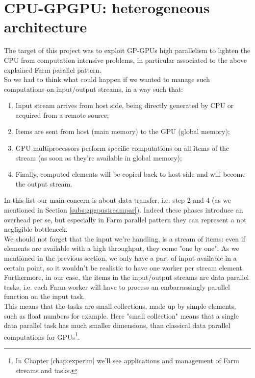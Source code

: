 	


\section{CPU-GPGPU: heterogeneous architecture}
	The target of this project was to exploit GP-GPUs high parallelism to lighten the CPU from computation intensive problems, in particular associated to the above explained Farm parallel pattern.\\
	So we had to think what could happen if we wanted to manage such computations on input/output streams, in a way such that:
	\begin{enumerate}
		\item Input stream arrives from host side, being directly generated by CPU or acquired from a remote source;
		
		\item Items are sent from host (main memory) to the GPU (global memory);
		
		\item GPU multiprocessors perform specific computations on all items of the stream (as soon as they're available in global memory);
		
		\item Finally, computed elements will be copied back to host side and will become the output stream. \\
	\end{enumerate}
	In this list our main concern is about data transfer, i.e. step 2 and 4 (as we mentioned in Section \ref{subs:gpgpustreampar}). 
	Indeed these phases introduce an overhead per se, but especially in Farm parallel pattern they can represent a not negligible bottleneck. \\
	We should not forget that the input we're handling, is a stream of items: even if elements are available with a high throughput, they come "one by one". As we mentioned in the previous section, we only have a part of input available in a certain point, so it wouldn't be realistic to have one worker per stream element.\\
	Furthermore, in our case, the items in the input/output streams are data parallel tasks, i.e. each Farm worker will have to process an embarrassingly parallel function on the input task.\\
	This means that the tasks are small collections, made up by simple elements, such as float numbers for example. Here "small collection" means that a single data parallel task has much smaller dimensions, than classical data parallel computations for GPUs\footnote{In Chapter \ref{chap:experim} we'll see applications and management of Farm streams and tasks.}.\\
	
